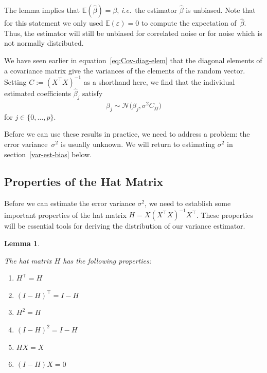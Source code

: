 \documentclass[
  a4paper,
]{article}
\providecommand{\tightlist}{%
  \setlength{\itemsep}{0pt}\setlength{\parskip}{0pt}}
\newtheorem{lemma}{Lemma}[section]
\theoremstyle{definition}
\theoremstyle{definition}
\theoremstyle{definition}
\theoremstyle{definition}
\theoremstyle{remark}
\begin{document}
The lemma implies that \(\mathbb{E}(\hat\beta) = \beta\), \emph{i.e.}~the estimator
\(\hat\beta\) is unbiased. Note that for this statement we only used \(\mathbb{E}(\varepsilon) =
0\) to compute the expectation of~\(\hat\beta\). Thus, the estimator will still
be unbiased for correlated noise or for noise which is not normally distributed.

We have seen earlier in equation~\eqref{eq:Cov-diag-elem} that the diagonal elements
of a covariance matrix give the variances of the elements of the random vector.
Setting \(C := (X^\top X)^{-1}\) as a shorthand here, we find that the
individual estimated coefficients \(\hat\beta_j\) satisfy
\begin{equation}
  \hat\beta_j
  \sim \mathcal{N}\bigl( \beta_j, \sigma^2 C_{jj} \bigr)  \label{eq:beta-hat-j}
\end{equation}
for \(j \in \{0, \ldots, p\}\).

Before we can use these results in practice, we need to address a problem:
the error variance~\(\sigma^2\) is usually unknown. We will return to
estimating \(\sigma^2\) in section~\ref{var-est-bias} below.

\subsection{Properties of the Hat Matrix}\label{hat-matrix}

Before we can estimate the error variance \(\sigma^2\), we need to establish some
important properties of the hat matrix \(H = X (X^\top X)^{-1} X^\top\). These
properties will be essential tools for deriving the distribution of our
variance estimator.

\begin{lemma}
\protect\hypertarget{lem:hat-matrix-props}{}\label{lem:hat-matrix-props}

The hat matrix \(H\) has the following properties:

\begin{enumerate}
\def\labelenumi{\arabic{enumi})}
\tightlist
\item
  \(H^\top = H\)
\item
  \((I-H)^\top = I-H\)
\item
  \(H^2 = H\)
\item
  \((I-H)^2 = I-H\)
\item
  \(HX = X\)
\item
  \((I-H)X = 0\)
\end{enumerate}

\end{lemma}
\end{document}
